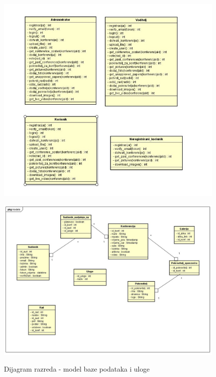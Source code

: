 			\text{}
			
			\begin{figure}
				\centering
				\begin{subcaption}[htb]
					
					\includegraphics[width=12cm]{slike/zajednoooooooo.jpg}

					\label{fig:fer-logo}
				\end{subcaption}%
				\begin{subcaption}[htb]
					
					\includegraphics[width=12cm]{slike/models.jpg}

					\label{fig:fer-logo}
				\end{subcaption}
				
				\caption{Dijagram razreda - model baze podataka i uloge}
			\end{figure}
			
